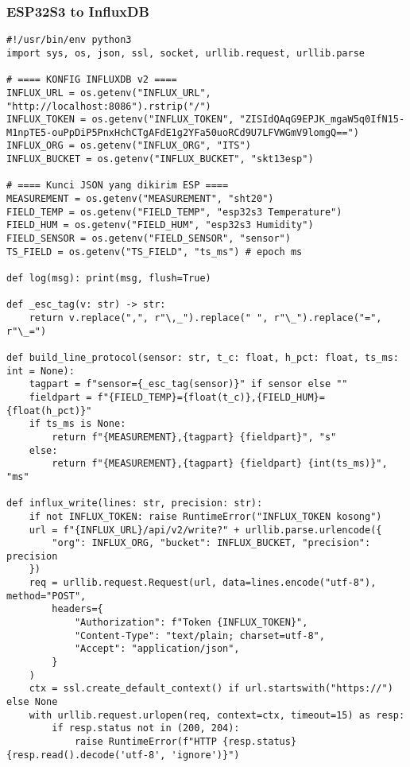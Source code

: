 \documentclass[a4paper, 12pt]{article}
\begin{document}
\subsubsection{ESP32S3 to InfluxDB}
\begin{lstlisting}[style=pythonstyle, caption={ESP32S3 to InfluxDB (python)}]
#!/usr/bin/env python3
import sys, os, json, ssl, socket, urllib.request, urllib.parse

# ==== KONFIG INFLUXDB v2 ====
INFLUX_URL = os.getenv("INFLUX_URL", "http://localhost:8086").rstrip("/")
INFLUX_TOKEN = os.getenv("INFLUX_TOKEN", "ZISIdQAqG9EPJK_mgaW5q0IfN15-M1npTE5-ouPpDiP5PnxHchCTgAFdE1g2YFa50uoRCd9U7LFVWGmV9lomgQ==")
INFLUX_ORG = os.getenv("INFLUX_ORG", "ITS")
INFLUX_BUCKET = os.getenv("INFLUX_BUCKET", "skt13esp")

# ==== Kunci JSON yang dikirim ESP ====
MEASUREMENT = os.getenv("MEASUREMENT", "sht20")
FIELD_TEMP = os.getenv("FIELD_TEMP", "esp32s3 Temperature")
FIELD_HUM = os.getenv("FIELD_HUM", "esp32s3 Humidity")
FIELD_SENSOR = os.getenv("FIELD_SENSOR", "sensor")
TS_FIELD = os.getenv("TS_FIELD", "ts_ms") # epoch ms

def log(msg): print(msg, flush=True)

def _esc_tag(v: str) -> str:
    return v.replace(",", r"\,_").replace(" ", r"\_").replace("=", r"\_=")

def build_line_protocol(sensor: str, t_c: float, h_pct: float, ts_ms: int = None):
    tagpart = f"sensor={_esc_tag(sensor)}" if sensor else ""
    fieldpart = f"{FIELD_TEMP}={float(t_c)},{FIELD_HUM}={float(h_pct)}"
    if ts_ms is None:
        return f"{MEASUREMENT},{tagpart} {fieldpart}", "s"
    else:
        return f"{MEASUREMENT},{tagpart} {fieldpart} {int(ts_ms)}", "ms"

def influx_write(lines: str, precision: str):
    if not INFLUX_TOKEN: raise RuntimeError("INFLUX_TOKEN kosong")
    url = f"{INFLUX_URL}/api/v2/write?" + urllib.parse.urlencode({
        "org": INFLUX_ORG, "bucket": INFLUX_BUCKET, "precision": precision
    })
    req = urllib.request.Request(url, data=lines.encode("utf-8"), method="POST",
        headers={
            "Authorization": f"Token {INFLUX_TOKEN}",
            "Content-Type": "text/plain; charset=utf-8",
            "Accept": "application/json",
        }
    )
    ctx = ssl.create_default_context() if url.startswith("https://") else None
    with urllib.request.urlopen(req, context=ctx, timeout=15) as resp:
        if resp.status not in (200, 204):
            raise RuntimeError(f"HTTP {resp.status} {resp.read().decode('utf-8', 'ignore')}")


\end{lstlisting}
\end{document}

